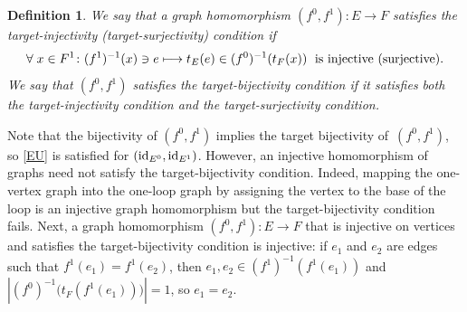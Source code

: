\documentclass[12pt,times,a4paper]{amsart}
\def\id{\mathop{\rm id}\nolimits}
\newtheorem{definition}[theorem]{Definition}
\numberwithin{equation}{section}
\def\text{\hbox}
\numberwithin{equation}{section}
\begin{document}
\begin{definition}
We say that a graph homomorphism $(f^0,f^1):E\to F$ satisfies the {\em target-injectivity (target-surjectivity) condition} if
\begin{equation}\label{EU}
\forall\; x\in F^1\colon (f^1)^{-1}(x)\ni e\longmapsto t_E(e) \in (f^0)^{-1}(t_F(x))\;\text{ is injective (surjective)}.
\end{equation}
We say that $(f^0,f^1)$ satisfies the {\em target-bijectivity condition} if it satisfies both the target-injectivity condition
and the target-surjectivity condition.
\end{definition}
\noindent
Note that the bijectivity of $(f^0,f^1)$ implies the target bijectivity of~$(f^0,f^1)$, so \eqref{EU} is satisfied for 
$(\id_{E^0},\id_{E^1})$. However, 
an injective homomorphism of graphs need not satisfy the target-bijectivity condition. Indeed, mapping
the one-vertex graph into the one-loop graph by assigning the vertex to the base of the loop is an
injective graph homomorphism but the target-bijectivity condition fails. 
Next, a graph homomorphism $(f^0,f^1)\colon E\to F$ that is 
injective on vertices and satisfies the target-bijectivity 
condition is injective: if $e_1$ and $e_2$ are edges such that $f^1(e_1)=f^1(e_2)$, then $e_1,e_2\in (f^1)^{-1}(f^1(e_1))$
and $|(f^0)^{-1}\big(t_F(f^1(e_1))\big)|=1$, so $e_1=e_2$.
\end{document}
